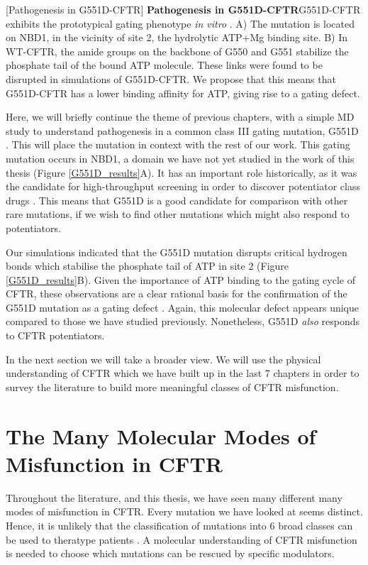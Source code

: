 \begingroup
\captionsetup{singlelinecheck = false, justification=raggedright}
[Pathogenesis in G551D-CFTR] {\textbf{Pathogenesis in G551D-CFTR}}{G551D-CFTR exhibits the prototypical gating phenotype \textit{in vitro} \cite{bompadre2007, wang2020}. A) The mutation is located on NBD1, in the vicinity of site 2, the hydrolytic ATP+Mg binding site. B) In WT-CFTR, the amide groups on the backbone of G550 and G551 stabilize the phosphate tail of the bound ATP molecule. These links were found to be disrupted in simulations of G551D-CFTR. We propose that this means that G551D-CFTR has a lower binding affinity for ATP, giving rise to a gating defect.} 
\label{G551D_results}
\endgroup

Here, we will briefly continue the theme of previous chapters, with a simple MD study to understand pathogenesis in a common class III gating mutation, G551D \cite{li1996}. This will place the mutation in context with the rest of our work. This gating mutation occurs in NBD1, a domain we have not yet studied in the work of this thesis (Figure \ref{G551D_results}A). It has an important role historically, as it was the candidate for high-throughput screening in order to discover potentiator class drugs \cite{vangoor2009}. This means that G551D is a good candidate for comparison with other rare mutations, if we wish to find other mutations which might also respond to potentiators.

Our simulations indicated that the G551D mutation disrupts critical hydrogen bonds which stabilise the phosphate tail of ATP in site 2 (Figure \ref{G551D_results}B). Given the importance of ATP binding to the gating cycle of CFTR, these observations are a clear rational basis for the confirmation of the G551D mutation as a gating defect \cite{bompadre2008}. Again, this molecular defect appears unique compared to those we have studied previously. Nonetheless, G551D \textit{also} responds to CFTR potentiators. 

In the next section we will take a broader view. We will use the physical understanding of CFTR which we have built up in the last 7 chapters in order to survey the literature to build more meaningful classes of CFTR misfunction.

\section{The Many Molecular Modes of Misfunction in CFTR}

Throughout the literature, and this thesis, we have seen many different many modes of misfunction in CFTR. Every mutation we have looked at seems distinct. Hence, it is unlikely that the classification of mutations into 6 broad classes can be used to theratype patients \cite{veit2016}. A molecular understanding of CFTR misfunction is needed to choose which mutations can be rescued by specific modulators. 

